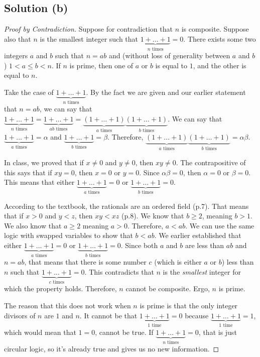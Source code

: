 \documentclass[11pt]{article}
\begin{document}
    \subsection{Solution (b)}
    \begin{proof}[Proof by Contradiction]
        Suppose for contradiction that $n$ is composite. 
        Suppose also that $n$ is the smallest integer such that $\underbrace{1 + \dots + 1}_{n \text{ times}} = 0$.
        There exists some two integers $a$ and $b$ such that $n = ab$ and (without loss of generality between $a$ and $b$) $1 < a \leq b < n$.
        If $n$ is prime, then one of $a$ or $b$ is equal to $1$, and the other is equal to $n$.

        Take the case of $\underbrace{1 + \dots + 1}_{n \text{ times}}$.
        By the fact we are given and our earlier statement that $n = ab$, we can say that $\underbrace{1 + \dots + 1}_{n \text{ times}} = \underbrace{1 + \dots + 1}_{ab \text{ times}} = \underbrace{(1 + \dots + 1)}_{a \text{ times}} \underbrace{(1 + \dots + 1)}_{b \text{ times}}$.
        We can say that $\underbrace{1 + \dots + 1}_{a \text{ times}} = \alpha$ and $\underbrace{1 + \dots + 1}_{b \text{ times}} = \beta$.
        Therefore, $\underbrace{(1 + \dots + 1)}_{a \text{ times}} \underbrace{(1 + \dots + 1)}_{b \text{ times}} = \alpha \beta$.

        In class, we proved that if $x \neq 0$ and $y \neq 0$, then $xy \neq 0$.
        The contrapositive of this says that if $xy = 0$, then $x = 0$ or $y = 0$.
        Since $\alpha \beta = 0$, then $\alpha = 0$ or $\beta = 0$.
        This means that either $\underbrace{1 + \dots + 1}_{a \text{ times}} = 0$ or $\underbrace{1 + \dots + 1}_{b \text{ times}} = 0$.

        According to the textbook, the rationals are an ordered field (p.7).
        That means that if $x > 0$ and $y < z$, then $xy < xz$ (p.8).
        We know that $b \geq 2$, meaning $b > 1$.
        We also know that $a \geq 2$ meaning $a > 0$.
        Therefore, $a < ab$.
        We can use the same logic with swapped variables to show that $b < ab$.
        We earlier established that either $\underbrace{1 + \dots + 1}_{a \text{ times}} = 0$ or $\underbrace{1 + \dots + 1}_{b \text{ times}} = 0$.
        Since both $a$ and $b$ are less than $ab$ and $n = ab$, that means that there is some number $c$ (which is either $a$ or $b$) less than $n$ such that $\underbrace{1 + \dots + 1}_{c \text{ times}} = 0$.
        This contradicts that $n$ is the \textit{smallest} integer for which the property holds.
        Therefore, $n$ cannot be composite.
        Ergo, $n$ is prime.

        The reason that this does not work when $n$ is prime is that the only integer divisors of $n$ are $1$ and $n$.
        It cannot be that $\underbrace{1 + \dots + 1}_{1 \text{ time}} = 0$ because $\underbrace{1 + \dots + 1}_{1 \text{ time}} = 1$, which would mean that $1 = 0$, cannot be true.
        If $\underbrace{1 + \dots + 1}_{n \text{ times}} = 0$, that is just circular logic, so it's already true and gives us no new information.
    \end{proof}
\end{document}
